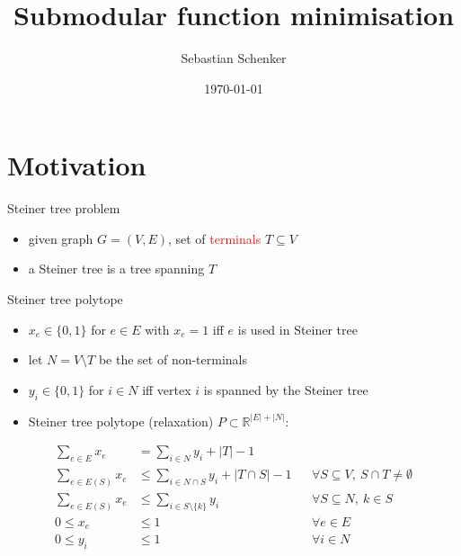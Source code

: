 \documentclass[usenames,dvipsnames]{beamer}
\title{Submodular function minimisation}
\date[]{\today}
\author[S. Schenker]{Sebastian Schenker}
\newcommand{\R}{\mathbb{R}}
\begin{document}
\maketitle

\begin{frame}
  \tableofcontents
\end{frame}

\section{Motivation}
\begin{frame}{Steiner tree problem}
  \begin{center}
    \end{center}
  \begin{itemize}
  \item given graph $G = (V,E)$, set of \textcolor{red}{terminals} $T \subseteq V$
  \item a Steiner tree is a tree spanning $T$
  \end{itemize}
\end{frame}

\begin{frame}{Steiner tree polytope}
  \begin{itemize}
  \item $x_e \in \{0,1\}$ for $e \in E$ with $x_e = 1$ iff  $e$ is used in Steiner tree
  \item let $N = V \setminus T$ be the set of non-terminals
  \item $y_i \in \{0,1\}$ for $i \in N$ iff vertex $i$ is spanned by the Steiner tree
  \item Steiner tree polytope (relaxation) $P \subset \R^{|E| + |N|}$:
  \end{itemize}
  \begin{align}
    \sum\limits_{e \in E} x_e &= \sum\limits_{i \in N} y_i + |T| - 1\\
    \sum\limits_{e \in E(S)} x_e &\leq \sum\limits_{i \in N \cap S} y_i + |T \cap S| -1 &&\forall S \subseteq V,~S \cap T \neq \emptyset\\
    \sum\limits_{e \in E(S)} x_e &\leq \sum\limits_{i \in S \setminus \{k\}} y_i &&\forall S \subseteq N,~k \in S\\
    0 \leq x_e &\leq 1 &&\forall e \in E\\
    0 \leq y_i &\leq 1 &&\forall i \in N
  \end{align}
\end{frame}
\end{document}
